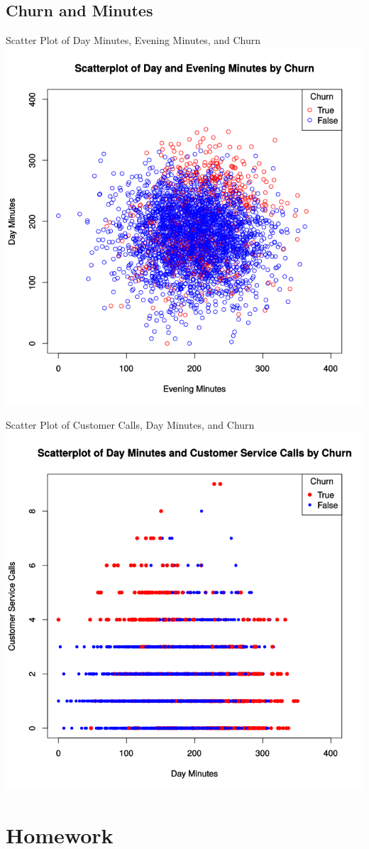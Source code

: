 \documentclass[handout]{beamer}
\begin{document}
\subsection{Churn and Minutes}
\begin{frame}{Scatter Plot of Day Minutes, Evening Minutes, and Churn}
    \centering
    \includegraphics[height=0.8\textheight]{images/scatter-minutes}
\end{frame}

\begin{frame}{Scatter Plot of Customer Calls, Day Minutes, and Churn}
    \centering
    \includegraphics[height=0.8\textheight]{images/scatter-minutes-calls}
\end{frame}

\section{Homework}
\end{document}
